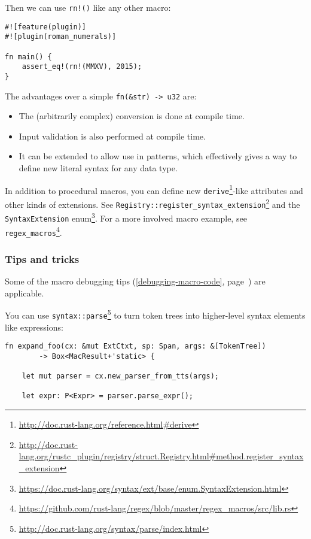 \documentclass[a4paper,]{book}
\renewcommand*{\hyperref}[2][\ar]{%
  \def\ar{#2}%
  #2 (\autoref{#1}, page~\pageref{#1})}
\renewcommand{\href}[2]{#2\footnote{\url{#1}}}
\begin{document}
Then we can use \texttt{rn!()} like any other macro:

\begin{verbatim}
#![feature(plugin)]
#![plugin(roman_numerals)]

fn main() {
    assert_eq!(rn!(MMXV), 2015);
}
\end{verbatim}

The advantages over a simple \texttt{fn(\&str)\ -\textgreater{}\ u32}
are:

\begin{itemize}
\itemsep1pt\parskip0pt
\item
  The (arbitrarily complex) conversion is done at compile time.
\item
  Input validation is also performed at compile time.
\item
  It can be extended to allow use in patterns, which effectively gives a
  way to define new literal syntax for any data type.
\end{itemize}

In addition to procedural macros, you can define new
\href{http://doc.rust-lang.org/reference.html\#derive}{\texttt{derive}}-like
attributes and other kinds of extensions. See
\href{http://doc.rust-lang.org/rustc_plugin/registry/struct.Registry.html\#method.register_syntax_extension}{\texttt{Registry::register\_syntax\_extension}}
and the
\href{https://doc.rust-lang.org/syntax/ext/base/enum.SyntaxExtension.html}{\texttt{SyntaxExtension}
enum}. For a more involved macro example, see
\href{https://github.com/rust-lang/regex/blob/master/regex_macros/src/lib.rs}{\texttt{regex\_macros}}.

\subsubsection{Tips and tricks}\label{tips-and-tricks}

Some of the \hyperref[debugging-macro-code]{macro debugging tips} are
applicable.

You can use
\href{http://doc.rust-lang.org/syntax/parse/index.html}{\texttt{syntax::parse}}
to turn token trees into higher-level syntax elements like expressions:

\begin{verbatim}
fn expand_foo(cx: &mut ExtCtxt, sp: Span, args: &[TokenTree])
        -> Box<MacResult+'static> {

    let mut parser = cx.new_parser_from_tts(args);

    let expr: P<Expr> = parser.parse_expr();
\end{verbatim}
\end{document}
